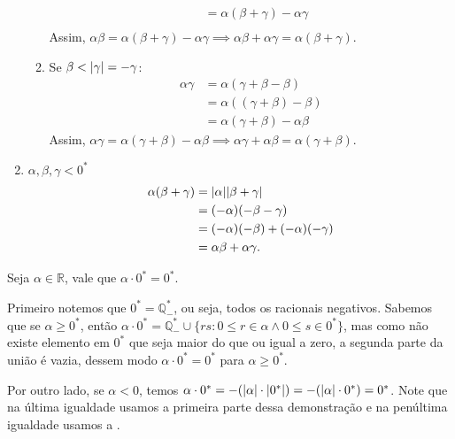 \documentclass[../main.tex]{subfiles}
\begin{document}
\begin{dem}
\begin{enumerate}
\begin{enumerate}
\begin{align*}
                        &= \alpha(\beta+\gamma) - \alpha\gamma \\
                    \end{align*}
                    Assim, $\alpha\beta = \alpha(\beta+\gamma) - \alpha\gamma \implies \alpha\beta + \alpha\gamma = \alpha(\beta+\gamma)$.
                \item Se $\beta < \abs{\gamma} = -\gamma$:
                    \begin{align*}
                        \alpha\gamma &= \alpha(\gamma+\beta-\beta) \\
                        &= \alpha((\gamma+\beta)-\beta) \\
                        &= \alpha(\gamma+\beta) - \alpha\beta
                    \end{align*}
                    Assim, $\alpha\gamma = \alpha(\gamma+\beta) - \alpha\beta \implies \alpha\gamma + \alpha\beta = \alpha(\gamma+\beta)$.
            \end{enumerate}
        \item $\alpha,\beta,\gamma < 0^*$
        \begin{align*}
            \alpha(\beta+\gamma) &= \abs{\alpha}\abs{\beta+\gamma} \\
            &= (-\alpha)(-\beta-\gamma) \\
            &= (-\alpha)(-\beta) + (-\alpha)(-\gamma) \\
            &= \alpha\beta + \alpha\gamma.
        \end{align*}
    \end{enumerate}
\end{dem}

\begin{teo}\label{reais-teo-anulamentoProduto}
    Seja $\alpha \in \mathbb{R}$, vale que $\alpha \cdot 0^* = 0^*$.
\end{teo}
\begin{dem}
    Primeiro notemos que $0^* = \mathbb{Q}_{-}^*$, ou seja, todos os racionais negativos. Sabemos que se $\alpha \geq 0^*$, 
    então $\alpha \cdot 0^* = \mathbb{Q}_{-}^* \cup \{ rs : 0 \leq r \in \alpha \land 0 \leq s \in 0^* \}$, mas como não existe elemento em $0^*$ que seja maior do que ou igual a zero, a segunda parte da união é vazia, dessem modo $\alpha \cdot 0^* = 0^*$ para $\alpha \geq 0^*$.

    Por outro lado, se $\alpha < 0$, temos $\alpha \cdot 0^* = -(\abs{\alpha} \cdot \abs{0^*}) = -(\abs{\alpha} \cdot 0^*) = 0^*$. Note que na última igualdade usamos a primeira parte dessa demonstração e na penúltima igualdade usamos a .
\end{dem}
\end{document}
